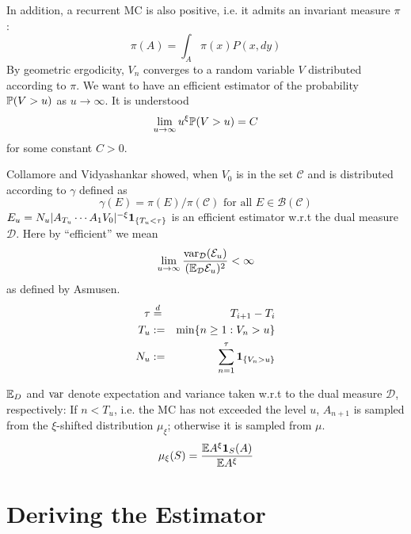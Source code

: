 \documentclass{beamer}
\begin{document}
\begin{frame}
  In addition, a recurrent MC is also positive, i.e. it admits an invariant
  measure $\pi$ \cite{Meyn:2009:MCS:1550713}:
  \[
  \pi(A) = \int_A \pi(x) P(x, dy)
  \]
  By geometric ergodicity, $V_n$ converges to a random variable $V$
  distributed according to $\pi$. We want to have an efficient estimator of the
  probability $\P(V > u)$ as $u \to \infty$. It is understood
  \[
   \lim_{u \to \infty} u^\xi \P(V > u) = C
  \]
  for some constant $C > 0$.
\end{frame}

\begin{frame}
  Collamore and Vidyashankar showed, when $V_0$ is in the set
  $\mathcal C$ and is distributed according to $\gamma$ defined as
  \[
  \gamma(E) = \pi(E)/\pi(\mathcal C)\text{ for all } E \in \mathcal B(\mathcal C)
  \]
  $E_u = N_u |A_{T_u} \cdots A_{1} V_0|^{-\xi}\1{T_u < \tau}$ is an efficient
  estimator w.r.t the dual measure $\mathcal D$. Here by ``efficient'' we mean
  \[
  \lim_{u \to \infty} {
    \var_{\mathcal D}(\mathcal E_u)
    \over
    (\E_{\mathcal D} \mathcal E_u)^2
  } < \infty
  \]
  as defined by Asmusen. 
  \begin{eqnarray*}
    \tau &\overset{d}{=}& T_{i+1} - T_i \\
    T_u &:=& \min\{n \geq 1: V_n > u\} \\
    N_u &:=& \sum_{n=1}^{\tau} \1{V_n > u}
  \end{eqnarray*}
\end{frame}

\begin{frame}
  $\E_D$ and $\var$ denote expectation and variance taken w.r.t to the
  dual measure $\mathcal D$, respectively: If $n < T_u$, i.e. the MC
  has not exceeded the level $u$, $A_{n+1}$ is sampled from the
  $\xi$-shifted distribution $\mu_\xi$; otherwise it is sampled from
  $\mu$.
  \[
  \mu_\xi (S) = {\E A^\xi \I{S}(A)
    \over
    \E A^\xi
    }
  \]
\end{frame}


\section{Deriving the Estimator}


\end{document}
